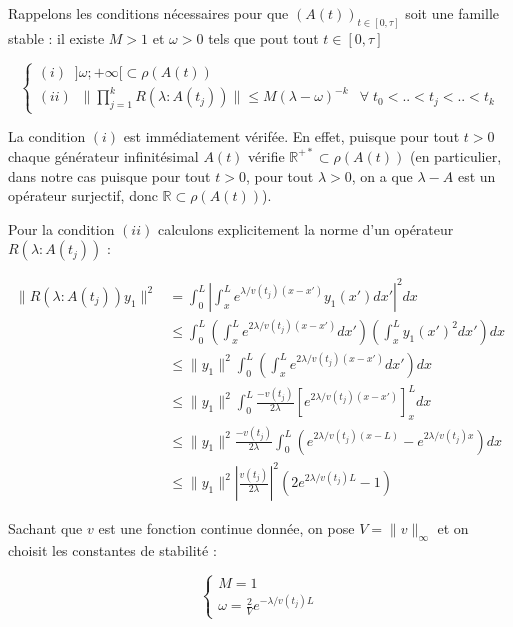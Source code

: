 \documentclass[a4paper]{article}
\begin{document}
\begin{preuve}
	Rappelons les conditions nécessaires pour que  $(A(t))_{t \in [0,\tau]}$  
	soit une famille stable :
	il existe $M>1$ et $\omega>0$ tels que pout tout $t \in [0,\tau]$ 
	
	\[ 
	\begin{cases}
		(i) \; \; ] \omega; +\infty[ \subset \rho(A(t)) & \\
		(ii) \; \; \|  \displaystyle \prod_{j=1}^{k} R(\lambda:A(t_j))\| \leq M(\lambda-\omega)^{-k} & \forall \; t_0<..<t_j<..<t_k
	\end{cases}
	\]
	
	La condition $(i)$ est immédiatement vérifée. En effet, puisque pour tout $t>0$
	chaque générateur infinitésimal $A(t)$ vérifie $ \mathbb{R}^{+*} \subset \rho(A(t)) $ 
	(en particulier, dans notre cas puisque pour tout $t>0$, pour tout $\lambda >0$, 
	on a que $\lambda - A$ est un opérateur surjectif, donc $\mathbb{R} \subset \rho(A(t)) $).
	
	Pour la condition $(ii)$ calculons explicitement la norme d'un opérateur $R(\lambda:A(t_j))$ :
	
	\[
	\begin{split}
		\displaystyle \|R(\lambda:A(t_j))y_1 \|^2 & = \int_0^L |\int_x^L e^{\lambda/v(t_j)(x-x')}y_1(x')dx'|^2dx \\
		                                          & \leq \int_0^L (\int_x^L e^{2\lambda/v(t_j)(x-x')}dx') (\int_x^L y_1(x')^2 dx') dx \\
												  & \leq \|y_1\|^2 \int_0^L (\int_x^L e^{2\lambda/v(t_j)(x-x')}dx')dx \\
												  & \leq \|y_1\|^2 \int_0^L \displaystyle \frac{-v(t_j)}{2\lambda}[e^{2\lambda/v(t_j)(x-x')}]_x^L dx \\
												  & \leq \|y_1\|^2 \displaystyle \frac{-v(t_j)}{2\lambda} \int_0^L (e^{2\lambda/v(t_j)(x-L)}-e^{2\lambda/v(t_j)x}) dx \\
												  & \leq \|y_1\|^2 \displaystyle |\frac{v(t_j)}{2\lambda}|^2(2e^{2\lambda/v(t_j)L}-1)
	\end{split}
	\]
	
	
	
	Sachant que $v$ est une fonction continue donnée, on pose $V = \|v\|_{\infty}$ 
	et on choisit les constantes de stabilité :
	
	\begin{equation}
		\begin{cases}
			M = 1 \\
			\omega = \frac{2}{V}e^{-\lambda/v(t_j)L}
		\end{cases}
	\end{equation}
	

\end{preuve}
\end{document}
